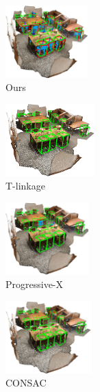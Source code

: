 \begin{figure}[ht]
      \begin{subfigure}{0.18\textwidth}
        \centering
        \includegraphics[height=2.8cm]{images/scan2cad-cad-ours1.png}
          \caption{Ours}
          \label{fig:scan2cad_cad-result1}
      \end{subfigure}
      \begin{subfigure}{0.18\textwidth}
        \centering
        \includegraphics[height=2.8cm]{images/scan2cad-cad-tlinkage1.png}
          \caption{T-linkage\cite{Tlinkage}}
          \label{fig:scan2cad_cad-tlinkage1}
      \end{subfigure}
      \begin{subfigure}{0.2\textwidth}
        \centering
        \includegraphics[height=2.8cm]{images/scan2cad-cad-progx1.png}
          \caption{Progressive-X\cite{ProgressiveX}}
          \label{fig:scan2cad_cad-prox1}
      \end{subfigure}
      \begin{subfigure}{0.18\textwidth}
        \centering
        \includegraphics[height=2.8cm]{images/scan2cad-cad-consac1.png}
          \caption{CONSAC\cite{CONSAC}}
          \label{fig:scan2cad_cad-consac1}
      \end{subfigure}
      \begin{subfigure}{0.18\textwidth}

\end{subfigure}
\end{figure}
